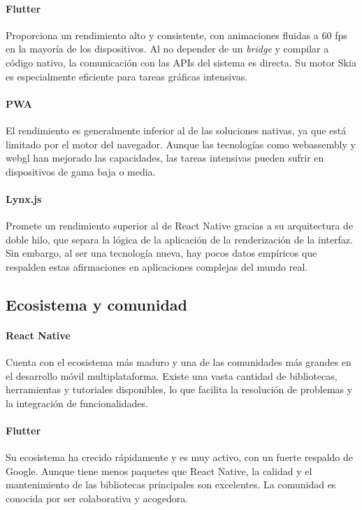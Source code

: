 \paragraph{Flutter}
Proporciona un rendimiento alto y consistente, con animaciones fluidas a 60 \acrshort{fps} en la mayoría de los dispositivos. Al no depender de un \textit{bridge} y compilar a código nativo, la comunicación con las APIs del sistema es directa. Su motor Skia es especialmente eficiente para tareas gráficas intensivas.

\paragraph{PWA}
El rendimiento es generalmente inferior al de las soluciones nativas, ya que está limitado por el motor del navegador. Aunque las tecnologías como \gls{webassembly} y \gls{webgl} han mejorado las capacidades, las tareas intensivas pueden sufrir en dispositivos de gama baja o media.

\paragraph{Lynx.js}
Promete un rendimiento superior al de React Native gracias a su arquitectura de doble hilo, que separa la lógica de la aplicación de la renderización de la interfaz. Sin embargo, al ser una tecnología nueva, hay pocos datos empíricos que respalden estas afirmaciones en aplicaciones complejas del mundo real.

\subsection{Ecosistema y comunidad}

\paragraph{React Native}
Cuenta con el ecosistema más maduro y una de las comunidades más grandes en el desarrollo móvil multiplataforma. Existe una vasta cantidad de bibliotecas, herramientas y tutoriales disponibles, lo que facilita la resolución de problemas y la integración de funcionalidades.

\paragraph{Flutter}
Su ecosistema ha crecido rápidamente y es muy activo, con un fuerte respaldo de Google. Aunque tiene menos paquetes que React Native, la calidad y el mantenimiento de las bibliotecas principales son excelentes. La comunidad es conocida por ser colaborativa y acogedora.

